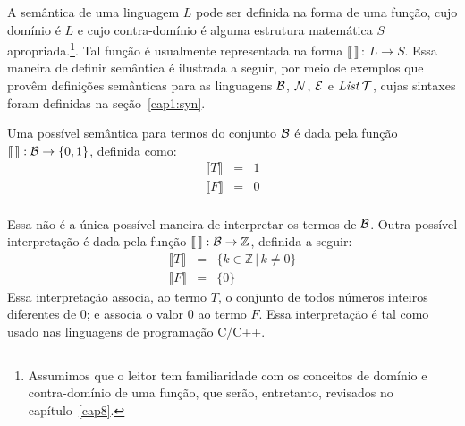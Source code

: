 A sem\^antica de uma linguagem $L$ pode ser definida na forma de uma função, cujo domínio é $L$ e cujo contra-domínio é alguma estrutura matemática $S$ apropriada.\footnote{Assumimos que o leitor tem familiaridade com os conceitos de dom\'inio e contra-dom\'inio de uma função, que serão, entretanto, revisados no cap\'itulo~\ref{cap8}.}.  Tal função é usualmente representada na forma $\llbracket\,\rrbracket\,:\,L \rightarrow S$. Essa maneira de definir semântica é ilustrada a seguir, por meio de exemplos que provêm definições semânticas para as linguagens $\mathcal{B}$, $\mathcal{N}$, $\mathcal{E}$ e $\textit{List\/}\,\mathcal{T}$, cujas sintaxes foram definidas na se\c{c}\~ao~\ref{cap1:syn}.

\begin{Definition}
Uma poss\'ivel sem\^antica para termos do conjunto $\mathcal{B}$ \'e dada pela fun\c{c}\~ao $\llbracket\,\rrbracket : \mathcal{B} \rightarrow \{0,1\}$, definida como:
\[
\begin{array}{lcl}
\llbracket T \rrbracket & = & 1\\
\llbracket F \rrbracket & = & 0\\
\end{array}
\]
\end{Definition}
Essa não é a \'unica poss\'ivel maneira de interpretar os termos de $\mathcal{B}$.
Outra poss\'ivel interpretação é dada pela função $\llbracket\,\rrbracket : \mathcal{B} \rightarrow \mathbb{Z}$, definida a seguir:
\[
\begin{array}{lcl}
\llbracket T \rrbracket & = & \{k\in\mathbb{Z}\,|\,k\neq 0\}\\
\llbracket F \rrbracket & = & \{0\}
\end{array}
\]
Essa interpretação associa, ao termo $T$, o conjunto de todos números inteiros diferentes de $0$; e associa o valor $0$ ao termo $F$. Essa interpretação é tal como usado nas linguagens de programa\c{c}\~ao C/C++.


